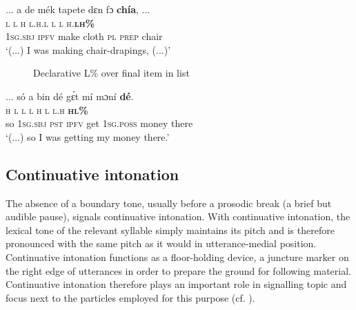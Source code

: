 \ea%
    \label{ex:key:90}
    \glll   \op...\cp{}  a    de  mék    tapete  dɛn  fɔ  \textbf{chía}, \op...\cp\\
{}  \textsc{l}    \textsc{l}  \textsc{h}    \textsc{l.h.l}    \textsc{l}  \textsc{l}  \textsc{h.}\textbf{\textsc{lh\%}}\\
{}  \textsc{1sg.sbj}  \textsc{ipfv}  make  cloth  \textsc{pl}  \textsc{prep}  chair\\
\glt ‘(...)  I was making chair-drapings, (...)’
\z

\begin{figure}
\caption{Declarative L\% over final item in list}
\label{fig:key:3.38}
\end{figure}



\ea%
    \label{ex:key:91}
\glll   \op...\cp{}  só  a    bin  dé  gɛ́t  mí    mɔní  \textbf{dé}.\\
{}  \textsc{h}  \textsc{l}    \textsc{l}  \textsc{l}  \textsc{h}  \textsc{l}    \textsc{l.h}    \textbf{\textsc{hl\%}}\\
{}  so  \textsc{1sg.sbj}  \textsc{pst}  \textsc{ipfv}  get  \textsc{1sg.poss}  money  there\\
\glt ‘(...) so I was getting my money there.’
\z


\subsection{Continuative intonation}\label{sec:3.4.4}

The absence of a boundary tone, usually before a prosodic break (a brief but audible pause), signals continuative intonation. With continuative intonation, the lexical tone of the relevant syllable simply maintains its pitch and is therefore pronounced with the same pitch as it would in utterance-medial position. Continuative intonation functions as a floor-holding device, a juncture marker on the right edge of utterances in order to prepare the ground for following material. Continuative intonation therefore plays an important role in signalling topic and focus next to the particles employed for this purpose (cf. ). 


